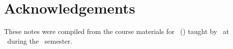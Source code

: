 \chapter*{Acknowledgements}
These notes were compiled from the course materials for \CourseCode\ (\CourseName) taught by \Instructor\, at \University\ during the \Semester\ semester.